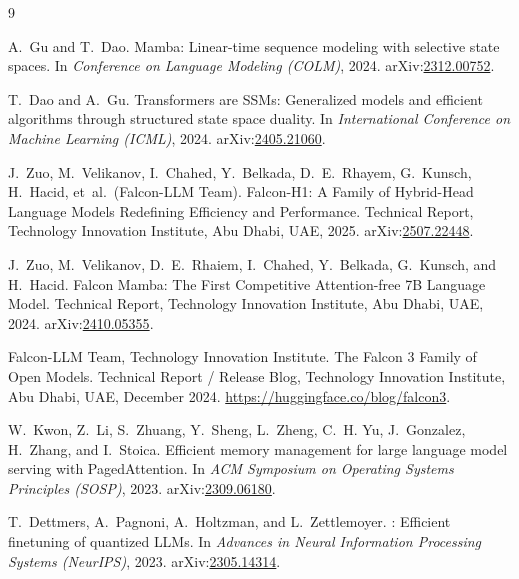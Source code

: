 \documentclass[10pt,a4paper]{article}
\begin{document}
\begin{thebibliography}{9}
\footnotesize
\setlength{\itemsep}{0.5pt plus 0.5pt}
\setlength{\parskip}{0pt}

A.~Gu and T.~Dao.
\newblock Mamba: Linear-time sequence modeling with selective state spaces.
\newblock In \emph{Conference on Language Modeling (COLM)}, 2024.
\newblock arXiv:\href{https://arxiv.org/abs/2312.00752}{2312.00752}.

T.~Dao and A.~Gu.
\newblock Transformers are {SSMs}: Generalized models and efficient algorithms through structured state space duality.
\newblock In \emph{International Conference on Machine Learning (ICML)}, 2024.
\newblock arXiv:\href{https://arxiv.org/abs/2405.21060}{2405.21060}.

J.~Zuo, M.~Velikanov, I.~Chahed, Y.~Belkada, D.~E.~Rhayem, G.~Kunsch, H.~Hacid, et~al.\ (Falcon-LLM Team).
\newblock Falcon-H1: A Family of Hybrid-Head Language Models Redefining Efficiency and Performance.
\newblock Technical Report, Technology Innovation Institute, Abu Dhabi, UAE, 2025.
\newblock arXiv:\href{https://arxiv.org/abs/2507.22448}{2507.22448}.

J.~Zuo, M.~Velikanov, D.~E.~Rhaiem, I.~Chahed, Y.~Belkada, G.~Kunsch, and H.~Hacid.
\newblock Falcon Mamba: The First Competitive Attention-free 7B Language Model.
\newblock Technical Report, Technology Innovation Institute, Abu Dhabi, UAE, 2024.
\newblock arXiv:\href{https://arxiv.org/abs/2410.05355}{2410.05355}.

Falcon-LLM Team, Technology Innovation Institute.
\newblock The Falcon 3 Family of Open Models.
\newblock Technical Report / Release Blog, Technology Innovation Institute, Abu Dhabi, UAE, December 2024.
\newblock \href{https://huggingface.co/blog/falcon3}{https://huggingface.co/blog/falcon3}.

W.~Kwon, Z.~Li, S.~Zhuang, Y.~Sheng, L.~Zheng, C.~H. Yu, J.~Gonzalez, H.~Zhang, and I.~Stoica.
\newblock Efficient memory management for large language model serving with {PagedAttention}.
\newblock In \emph{ACM Symposium on Operating Systems Principles (SOSP)}, 2023.
\newblock arXiv:\href{https://arxiv.org/abs/2309.06180}{2309.06180}.

T.~Dettmers, A.~Pagnoni, A.~Holtzman, and L.~Zettlemoyer.
: Efficient finetuning of quantized {LLMs}.
\newblock In \emph{Advances in Neural Information Processing Systems (NeurIPS)}, 2023.
\newblock arXiv:\href{https://arxiv.org/abs/2305.14314}{2305.14314}.


\end{thebibliography}
\end{document}
